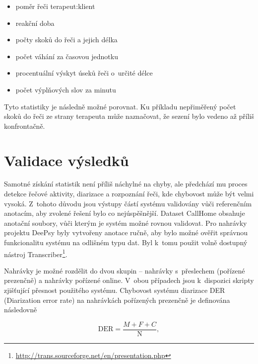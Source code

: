 \begin{itemize}
    \item poměr řeči terapeut:klient
    \item reakční doba
    \item počty skoků do řeči a jejich délka
    \item počet váhání za časovou jednotku
    \item procentuální výskyt úseků řeči o~určité délce
    \item počet výplňových slov za minutu
\end{itemize}

Tyto statistiky je následně možné porovnat. Ku příkladu nepřiměřený počet skoků do řeči ze strany terapeuta může naznačovat, že sezení bylo vedeno až příliš konfrontačně.


\section{Validace výsledků}
\label{section:Validation}
Samotné získání statistik není příliš náchylné na chyby, ale předchází mu proces detekce řečové aktivity, diarizace a rozpoznání řeči, kde chybovost může být velmi vysoká. Z~tohoto důvodu jsou výstupy částí systému validovány vůči referenčním anotacím, aby zvolené řešení bylo co nejúspěšnější. Dataset CallHome obsahuje anotační soubory, vůči kterým je systém možné rovnou validovat. Pro nahrávky projektu DeePsy byly vytvořeny anotace ručně, aby bylo možné ověřit správnou funkcionalitu systému na odlišném typu dat. Byl k~tomu použit volně dostupný nástroj Transcriber\footnote{\url{http://trans.sourceforge.net/en/presentation.php}}.

Nahrávky je možné rozdělit do dvou skupin -- nahrávky s~přeslechem (pořízené prezenčně) a nahrávky pořízené online. V~obou případech jsou k~dispozici skripty zjišťující přesnost použitého systému. Chybovost systému diarizace DER (Diarization error rate) na nahrávkách pořízených prezenčně je definována následovně

\begin{equation}
\label{eqn:DER_offline}
    \text{DER} = \frac{M + F + C}{\text{N}},
\end{equation}

